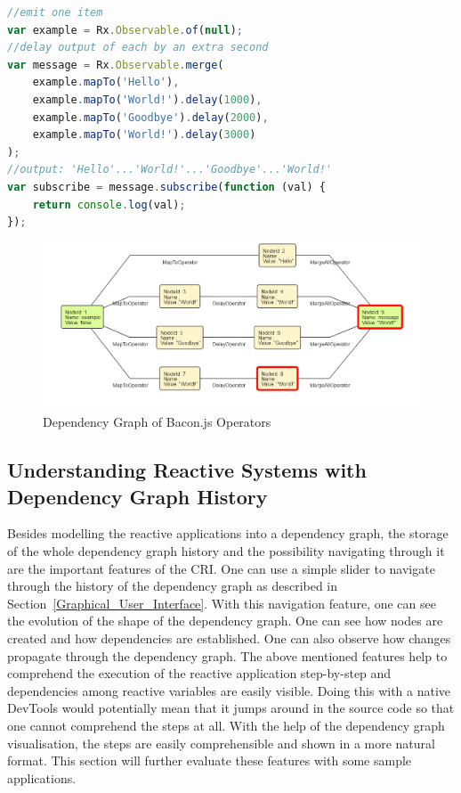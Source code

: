 \begin{lstlisting}[language=JavaScript, caption=Understanding RxJS Operators, label={lst:evaluation-rxjs-opr}]
//emit one item
var example = Rx.Observable.of(null);
//delay output of each by an extra second
var message = Rx.Observable.merge(
	example.mapTo('Hello'),
	example.mapTo('World!').delay(1000),
	example.mapTo('Goodbye').delay(2000),
	example.mapTo('World!').delay(3000)
);
//output: 'Hello'...'World!'...'Goodbye'...'World!'
var subscribe = message.subscribe(function (val) {
	return console.log(val);
});
\end{lstlisting}

\begin{figure}[!h]
	\centering
	\includegraphics[width=\textwidth,height=\textheight,keepaspectratio]{gfx/evaluation/rxjs-operator-delay.png}
	\caption{Dependency Graph of Bacon.js Operators}
	\label{fig:rxjs-operator-delay}
\end{figure}

\subsection{Understanding Reactive Systems with Dependency Graph History}

Besides modelling the reactive applications into a dependency graph, the storage of the whole dependency graph history and the possibility navigating through it are the important features of the CRI. One can use a simple slider to navigate through the history of the dependency graph as described in Section~\ref{Graphical_User_Interface}. With this navigation feature, one can see the evolution of the shape of the dependency graph. One can see how nodes are created and how dependencies are established. One can also observe how changes propagate through the dependency graph. The above mentioned features help to comprehend the execution of the reactive application step-by-step and dependencies among reactive variables are easily visible. Doing this with a native DevTools would potentially mean that it jumps around in the source code so that one cannot comprehend the steps at all. With the help of the dependency graph visualisation, the steps are easily comprehensible and shown in a more natural format. 
This section will further evaluate these features with some sample applications.

